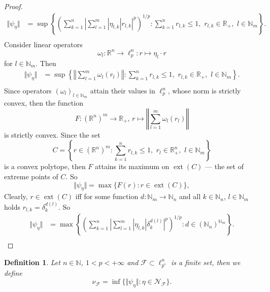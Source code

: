 \documentclass[12pt]{article}
\newtheorem{definition}[theorem]{Definition}
\begin{document}
\begin{proof}
\[\begin{aligned}
        \Vert \psi_{\eta}\Vert
        &=\sup\left\{
            \left(\sum_{k=1}^n
                \left|\sum_{l=1}^{m}|\eta_{l,k}| r_{l,k}\right|^p
            \right)^{1/p}:
            \sum_{k=1}^n r_{l,k}\leq 1,\,\, 
            r_{l,k}\in\mathbb{R}_+,\,\, 
            l\in\mathbb{N}_m
        \right\}. \\
    \end{aligned}
    \]
    Consider linear operators
    \[
        \omega_l:\mathbb{R}^n\to\ell_p^n: r\mapsto \eta_l\cdot r
    \]
    for $l\in\mathbb{N}_m$. Then 
    \[
    \begin{aligned}
        \Vert\psi_{\eta}\Vert
        &=\sup\left\{
            \left\Vert\sum_{l=1}^m\omega_l(r_l)\right\Vert:
            \sum_{k=1}^n r_{l,k}\leq 1,\,\, 
            r_{l,k}\in\mathbb{R}_+,\,\, 
            l\in\mathbb{N}_m
        \right\}. \\
    \end{aligned}
    \]
    Since operators $(\omega_l)_{l\in\mathbb{N}_m}$ attain their values 
    in $\ell_{p}^n$, whose norm is strictly convex, then the function
    \[
        F:(\mathbb{R}^n)^m\to\mathbb{R}_+,\, 
        r\mapsto \left\Vert\sum_{l=1}^m \omega_l(r_l)\right\Vert
    \]
    is strictly convex. Since the set
    \[
        C=\left\{ 
            r\in(\mathbb{R}^n)^m :
            \sum_{k=1}^n r_{l,k}\leq 1,\,\, 
            r_l\in\mathbb{R}^n_+,\,\, 
            l\in\mathbb{N}_m
        \right\}
    \]
    is a convex polytope, then $F$ attains its maximum 
    on $\operatorname{ext}(C)$ --- the set of extreme points of $C$. So
    \[
        \Vert\psi_\eta\Vert=\max\{F(r) : r\in \operatorname{ext}(C)\},
    \]
    Clearly, $r\in \operatorname{ext}(C)$ iff for some 
    function $d:\mathbb{N}_m\to\mathbb{N}_n$ and 
    all $k\in\mathbb{N}_n$, $l\in\mathbb{N}_m$ 
    holds $r_{l,k}=\delta_{k}^{d(l)}$. So 
    \[
    \begin{aligned}
        \Vert\psi_{\eta}\Vert
        &=\max\left\{
            \left(\sum_{k=1}^n
                \left|\sum_{l=1}^{m}|\eta_{l,k}| \delta_{k}^{d(l)}\right|^p
            \right)^{1/p}:
            d\in(\mathbb{N}_n)^{\mathbb{N}_m}
        \right\}. \\
    \end{aligned}
    \]
\end{proof}

\begin{definition}\label{ExtMorphsNormInf}
    Let $n\in\mathbb{N}$, $1<p<+\infty$ and $\mathcal{F}\subset \ell_{p^*}^n$ is 
    a finite set, then we define
    \[
        \nu_{\mathcal{F}}=\inf\{
            \Vert \psi_{\eta} \Vert : \eta\in\mathcal{N}_{\mathcal{F}}
        \}.
    \]
\end{definition}
\end{document}

